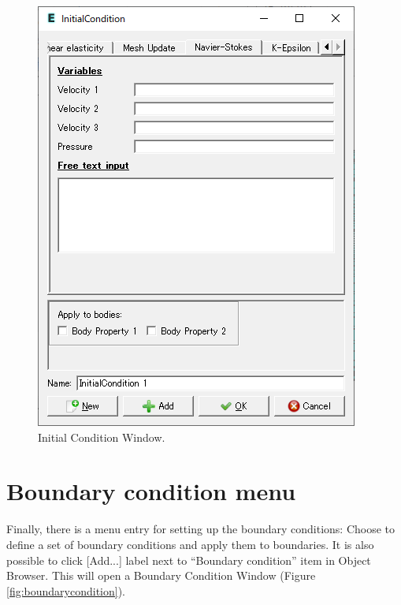 \begin{figure}[htb]
\begin{center}
 \includegraphics[scale=0.5]{images/initialcondition.png}
\caption{Initial Condition Window.}
\label{fig:initialcondition}
\end{center}
\end{figure}

\section{Boundary condition menu}

Finally, there is a menu entry for setting up the boundary conditions:
\noindent Choose
\noindent to define a set of boundary conditions and apply them to boundaries. It is also possible to click [Add...] label next to ``Boundary condition'' item in Object Browser. This will open a Boundary Condition Window (Figure \ref{fig:boundarycondition}). 

